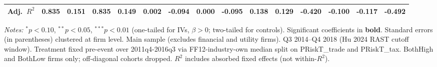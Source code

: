 \documentclass[11pt,a4paper]{article}
\begin{document}
\begin{table}[htbp]
\begin{tabular}{lcccccccccccccc}
Adj.~$R^2$ & 0.835 & 0.151 & 0.835 & 0.149 & 0.002 & -0.094 & 0.000 & -0.095 & 0.138 & 0.129 & -0.420 & -0.100 & -0.117 & -0.492 \\
\bottomrule
\end{tabular}
\begin{minipage}{\linewidth}
\vspace{2pt}\scriptsize
\textit{Notes:} $^{*}p<0.10$, $^{**}p<0.05$, $^{***}p<0.01$ (one-tailed for IVs, $\beta > 0$; two-tailed for controls).
 Significant coefficients in \textbf{bold}.
 Standard errors (in parentheses) clustered at firm level.
 Main sample (excludes financial and utility firms). Q3 2014--Q4 2018 (Hu 2024 RAST cutoff window). Treatment fixed pre-event over 2011q4-2016q3 via FF12-industry-own median split on PRiskT\_trade and PRiskT\_tax. BothHigh and BothLow firms only; off-diagonal cohorts dropped.
 $R^2$ includes absorbed fixed effects (not within-$R^2$).
\end{minipage}
\end{table}
\clearpage
\end{document}

